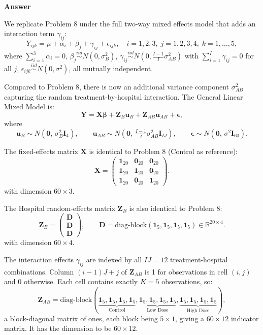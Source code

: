 \documentclass[letterpaper]{article}
\begin{document}
		
	\textbf{Answer}
	
	
	We replicate Problem 8 under the full two-way mixed effects model that adds
	an interaction term $\gamma_{ij}$:
	\[
	Y_{ijk} = \mu + \alpha_i + \beta_j + \gamma_{ij} + \epsilon_{ijk},
	\quad i=1,2,3,\; j=1,2,3,4,\; k=1,\ldots,5,
	\]
	where $\sum_{i=1}^3\alpha_i=0$,\;
	$\beta_j\overset{iid}{\sim}N(0,\sigma^2_B)$,\;
	$\gamma_{ij}\overset{iid}{\sim}N\!\left(0,\tfrac{I-1}{I}\sigma^2_{AB}\right)$
	with $\sum_{i=1}^I\gamma_{ij}=0$ for all $j$,\;
	$\epsilon_{ijk}\overset{iid}{\sim}N(0,\sigma^2)$,
	all mutually independent.
	
	Compared to Problem 8, there is now an additional variance component
	$\sigma^2_{AB}$ capturing the random treatment-by-hospital interaction.
	The General Linear Mixed Model is:
	\[
	\mathbf{Y} = \mathbf{X}\boldsymbol{\beta}
	+ \mathbf{Z}_B\mathbf{u}_B
	+ \mathbf{Z}_{AB}\mathbf{u}_{AB}
	+ \boldsymbol{\epsilon},
	\]
	where
	\[
	\mathbf{u}_B \sim N(\mathbf{0},\,\sigma^2_B\mathbf{I}_4), \qquad
	\mathbf{u}_{AB} \sim N\!\left(\mathbf{0},\,\tfrac{I-1}{I}\sigma^2_{AB}\mathbf{I}_{IJ}\right), \qquad
	\boldsymbol{\epsilon} \sim N(\mathbf{0},\,\sigma^2\mathbf{I}_{60}).
	\]
	
	The fixed-effects matrix $\mathbf{X}$ is identical to Problem 8 (Control as reference):
	\[
	\mathbf{X} =
	\begin{pmatrix}
		\mathbf{1}_{20} & \mathbf{0}_{20} & \mathbf{0}_{20} \\
		\mathbf{1}_{20} & \mathbf{1}_{20} & \mathbf{0}_{20} \\
		\mathbf{1}_{20} & \mathbf{0}_{20} & \mathbf{1}_{20}
	\end{pmatrix}.
	\]
	with dimension $60\times 3$.
	
	The Hospital random-effects matrix $\mathbf{Z}_B$ is also identical to Problem 8:
	\[
	\mathbf{Z}_B =
	\begin{pmatrix} \mathbf{D} \\ \mathbf{D} \\ \mathbf{D} \end{pmatrix},
	\qquad
	\mathbf{D} = \mathrm{diag\text{-}block}(\mathbf{1}_5,\mathbf{1}_5,\mathbf{1}_5,\mathbf{1}_5) \in \mathbb{R}^{20\times 4}.
	\]
	with dimension $60\times 4$.
	
	
	The interaction effects $\gamma_{ij}$ are indexed by all $IJ = 12$
	treatment-hospital combinations. Column $(i-1)J+j$ of $\mathbf{Z}_{AB}$
	is 1 for observations in cell $(i,j)$ and 0 otherwise. Each cell contains
	exactly $K=5$ observations, so:
	\[
	\mathbf{Z}_{AB} = \mathrm{diag\text{-}block}(
	\underbrace{\mathbf{1}_5,\mathbf{1}_5,\mathbf{1}_5,\mathbf{1}_5}_{\text{Control}},
	\underbrace{\mathbf{1}_5,\mathbf{1}_5,\mathbf{1}_5,\mathbf{1}_5}_{\text{Low Dose}},
	\underbrace{\mathbf{1}_5,\mathbf{1}_5,\mathbf{1}_5,\mathbf{1}_5}_{\text{High Dose}}
	),
	\]
	a block-diagonal matrix of ones, each block being $5\times 1$, giving a
	$60\times 12$ indicator matrix. It has the dimension to be $60\times 12$.
	
\end{document}
